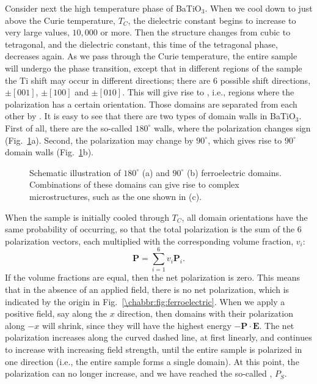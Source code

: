 Consider next the high temperature phase of BaTiO$_3$.  When we cool down to just above the Curie temperature, $T_C$, the dielectric constant begins to increase to very large values, $10,000$ or more.  Then the structure changes from cubic to tetragonal, and the dielectric constant, this time of the tetragonal phase, decreases again.  As we pass through the Curie temperature, the entire sample will undergo the phase transition, except that in different regions of  the sample the Ti shift may occur in different directions; there are $6$ possible shift directions, $\pm [001]$, $\pm [100]$ and $\pm [010]$.  This will give rise to , i.e., regions where the polarization has a certain orientation.  Those domains are separated from each other by .  It is easy to see that there are two types of domain walls in BaTiO$_3$.  First of all, there are the so-called $180^{\circ}$ walls, where the polarization changes sign (Fig.~\ref{\chabbr:fig:domains}a).  Second, the polarization may change by $90^{\circ}$, which gives rise to $90^{\circ}$ domain walls (Fig.~\ref{\chabbr:fig:domains}b).  

\begin{figure}[h]
\centering\leavevmode
\caption{Schematic illustration of $180^{\circ}$ (a) and $90^{\circ}$ (b) ferroelectric domains. Combinations of these domains can give rise to complex microstructures, such as the one shown in (c).}
\label{\chabbr:fig:domains}
\end{figure}

When the sample is initially cooled through $T_C$, all domain orientations have the same probability of occurring, so that the total polarization is the sum of the $6$ polarization vectors, each multiplied with the corresponding volume fraction, $v_i$:
\begin{equation}
	\mathbf{P} = \sum_{i=1}^6 v_i \mathbf{P}_i.
\end{equation}
If the volume fractions are equal, then the net polarization is zero.  This means that in the absence of an applied field, there is no net polarization, which is indicated by the origin in Fig.~\ref{\chabbr:fig:ferroelectric}.  When we apply a positive field, say along the $x$ direction, then domains with their polarization along $-x$ will shrink, since they will have the highest energy $-\mathbf{P}\cdot\mathbf{E}$.  The net polarization increases along the curved dashed line, at first linearly, and continues to increase with increasing field strength, until the entire sample is polarized in one direction (i.e., the entire sample forms a single domain).  At this point, the polarization can no longer increase, and we have reached the so-called , $P_S$.

